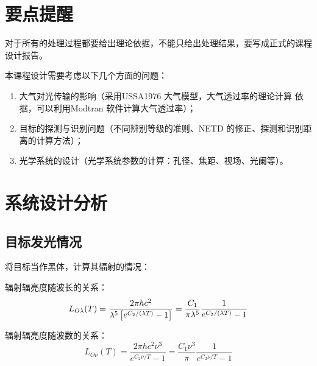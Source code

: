 \documentclass[11pt]{article}
\begin{document}
\section{要点提醒}
对于所有的处理过程都要给出理论依据，不能只给出处理结果，要写成正式的课程设计报告。\par
本课程设计需要考虑以下几个方面的问题：
\begin{enumerate}
  \item 大气对光传输的影响（采用USSA1976 大气模型，大气透过率的理论计算  依据，可以利用Modtran 软件计算大气透过率）；
  \item 目标的探测与识别问题（不同辨别等级的准则、NETD 的修正、探测和识别距离的计算方法）；
  \item 光学系统的设计（光学系统参数的计算：孔径、焦距、视场、光阑等）。
\end{enumerate}
\section{系统设计分析}
\subsection{目标发光情况}
将目标当作黑体，计算其辐射的情况：\par
辐射辐亮度随波长的关系：
\begin{equation}
  L_{O\lambda}(T)=\frac{2\pi hc^2}{\lambda^5 \left[e^{C_2/(\lambda T)}-1\right]}=\frac{C_1}{\pi\lambda^5}\frac{1}{e^{C_2/(\lambda T)}-1}
  \label{forem:普朗克公式，辐亮度，波长}
\end{equation}

辐射辐亮度随波数的关系：
\begin{equation}
  L_{O\nu}(T)=\frac{2\pi hc^2\nu^3}{e^{C_2\nu/T}-1}=\frac{C_1\nu^3}{\pi}\frac{1}{e^{C_2\nu/T}-1}
  \label{forem:普朗克公式，辐亮度，波数}
\end{equation}
\end{document}
